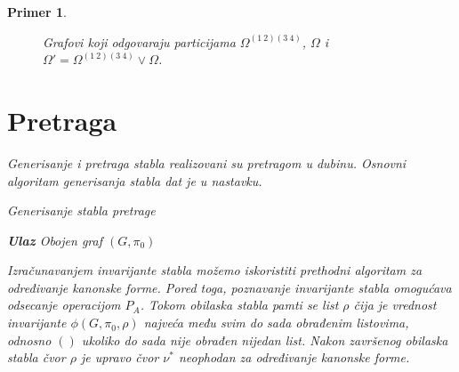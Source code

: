 \documentclass[12pt,oneside]{memoir}
\newtheorem{example}{Primer}
\theoremstyle{definition}
\begin{document}
\begin{example}
\begin{figure}[htp]
	   \caption{Grafovi koji odgovaraju particijama $\Omega^{(1\ 2)(3\ 4)}$,
	   $\Omega$ i $\Omega' = \Omega^{(1\ 2)(3\ 4)} \lor \Omega$.}
	   \label{img:orbits}
   \end{figure}

 \section{Pretraga}

  Generisanje i pretraga stabla realizovani su pretragom u dubinu. Osnovni
  algoritam generisanja stabla dat je u nastavku.

  \begin{algorithm}[H]
	  \caption{Generisanje stabla pretrage}
	  \textbf{Ulaz} Obojen graf $(G, \pi_0)$
	  \begin{algorithmic}[1]
		  \EndFor
		  \EndProcedure

	  \end{algorithmic}
  \end{algorithm}

  Izračunavanjem invarijante stabla možemo iskoristiti prethodni algoritam za
  određivanje kanonske forme. Pored toga, poznavanje invarijante stabla
  omogućava odsecanje operacijom $P_A$. Tokom obilaska stabla pamti se list
  $\rho$ čija je vrednost invarijante $\phi(G, \pi_0, \rho)$ najveća među svim
  do sada obrađenim listovima, odnosno $()$ ukoliko do sada nije obrađen
  nijedan list. Nakon završenog obilaska stabla čvor $\rho$ je upravo čvor
  $\nu^*$ neophodan za određivanje kanonske forme.


\end{example}
\end{document}
